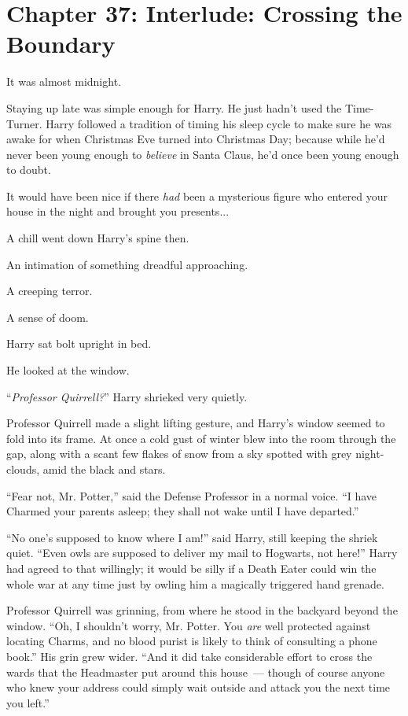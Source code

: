 \chapter{Chapter 37: Interlude: Crossing the Boundary}
It was almost midnight.

Staying up late was simple enough for Harry. He just hadn't used the Time-Turner. Harry followed a tradition of timing his sleep cycle to make sure he was awake for when Christmas Eve turned into Christmas Day; because while he'd never been young enough to \emph{believe} in Santa Claus, he'd once been young enough to doubt.

It would have been nice if there \emph{had} been a mysterious figure who entered your house in the night and brought you presents...

A chill went down Harry's spine then.

An intimation of something dreadful approaching.

A creeping terror.

A sense of doom.

Harry sat bolt upright in bed.

He looked at the window.

``\emph{Professor Quirrell?}'' Harry shrieked very quietly.

Professor Quirrell made a slight lifting gesture, and Harry's window seemed to fold into its frame. At once a cold gust of winter blew into the room through the gap, along with a scant few flakes of snow from a sky spotted with grey night-clouds, amid the black and stars.

``Fear not, Mr. Potter,'' said the Defense Professor in a normal voice. ``I have Charmed your parents asleep; they shall not wake until I have departed.''

``No one's supposed to know where I am!'' said Harry, still keeping the shriek quiet. ``Even owls are supposed to deliver my mail to Hogwarts, not here!'' Harry had agreed to that willingly; it would be silly if a Death Eater could win the whole war at any time just by owling him a magically triggered hand grenade.

Professor Quirrell was grinning, from where he stood in the backyard beyond the window. ``Oh, I shouldn't worry, Mr. Potter. You \emph{are} well protected against locating Charms, and no blood purist is likely to think of consulting a phone book.'' His grin grew wider. ``And it did take considerable effort to cross the wards that the Headmaster put around this house~--- though of course anyone who knew your address could simply wait outside and attack you the next time you left.''

